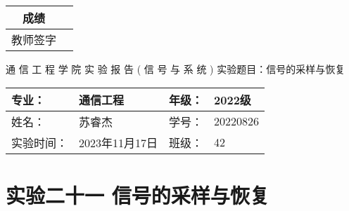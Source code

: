 \documentclass[dvipsnames, svgnames,a4paper,11pt]{article}
\begin{document}
\begin{table}
  \raggedleft
	\renewcommand\arraystretch{1.7}
	\begin{tabular}{|c|p{4em}|}
	\hline
	成绩 &  \\
	\hline
	教师签字 &   \\
	\hline
	\end{tabular}
\end{table}

\begin{center}
	{\kaishu \LARGE   \quad  \quad 通  \quad 信  \quad 工  \quad 程  \quad 学  \quad 院 }
  \newline
  \newline
  \newline
  \newline
  \newline
  {\kaishu \Huge 实 \quad  \quad  \quad 验  \quad  \quad  \quad 报 \quad  \quad  \quad 告}
  \newline
  \newline
  \newline
  \newline
  \newline
  {\songti \Huge  ( \quad  信  \quad 号  \quad 与  \quad 系  \quad 统 \quad)}
  \newline
  \newline
  \newline
  \newline
  \newline
  {\songti  \LARGE 实验题目：信号的采样与恢复  \quad  \quad \quad}
\end{center}



\begin{table}[b]
	\renewcommand\arraystretch{1.7}
	\begin{tabularx}{\textwidth}{|X|X|X|X|}
	\hline
	专业：& 通信工程 &年级：& 2022级\\
	\hline
	姓名：& 苏睿杰  & 学号：& 20220826\\
	\hline
	实验时间：& 2023年11月17日 & 班级：& 42 \\
	\hline
	\end{tabularx}
\end{table}



\clearpage
\setcounter{section}{0}
\section{实验二十一 \quad 信号的采样与恢复}
\end{document}
